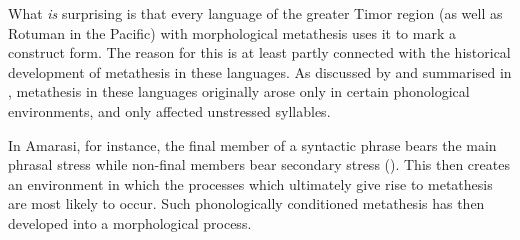 What \emph{is} surprising is that every language of the greater Timor
region (as well as Rotuman in the Pacific)
with morphological metathesis uses it to mark a construct form.
The reason for this is at least partly connected with the historical development
of metathesis in these languages.
As discussed by \cite{blga98} and summarised in ,
metathesis in these languages originally
arose only in certain phonological environments,
and only affected unstressed syllables.

In Amarasi, for instance, the final member of a syntactic
phrase bears the main phrasal stress
while non-final members bear secondary stress  ().
This then creates an environment in
which the processes which ultimately give rise to metathesis are most likely to occur.
Such phonologically conditioned metathesis has then developed into a morphological process.

